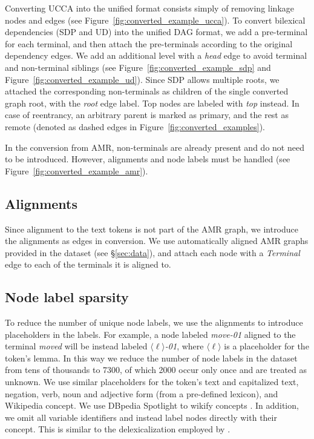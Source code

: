 \documentclass[11pt,a4paper]{article}
\begin{document}
Converting UCCA into the unified format consists simply of removing linkage nodes
and edges (see Figure~\ref{fig:converted_example_ucca}).
To convert bilexical dependencies (SDP and UD) into the unified DAG format,
we add a pre-terminal for each terminal,
and then attach the pre-terminals according to the original dependency edges.
We add an additional level with a \textit{head} edge to avoid terminal and non-terminal siblings
(see Figure~\ref{fig:converted_example_sdp} and Figure~\ref{fig:converted_example_ud}).
Since SDP allows multiple roots, we attached the corresponding non-terminals as children of
the single converted graph root, with the \textit{root} edge label.
Top nodes are labeled with \textit{top} instead.
In case of reentrancy, an arbitrary parent is marked as primary, and the rest as remote
(denoted as dashed edges in Figure~\ref{fig:converted_examples}).

In the conversion from AMR, non-terminals are already present and do not need to be introduced.
However, alignments and node labels must be handled
(see Figure~\ref{fig:converted_example_amr}).

\subsection{Alignments}
Since alignment to the text tokens is not part of the AMR graph,
we introduce the alignments as edges in conversion.
We use automatically aligned AMR graphs provided in the dataset (see \S\ref{sec:data}),
and attach each node with a \textit{Terminal} edge to each of the terminals it is aligned to.

\subsection{Node label sparsity}
To reduce the number of unique node labels, we use the alignments to introduce
placeholders in the labels.
For example, a node labeled \textit{move-01} aligned to the terminal \textit{moved} will
be instead labeled $\langle \ell \rangle$\textit{-01},
where $\langle \ell \rangle$ is a placeholder for the token's lemma.
In this way we reduce the number of node labels in the dataset from tens of thousands to 7300,
of which 2000 occur only once and are treated as unknown.
We use similar placeholders for the token's text and capitalized text,
negation, verb, noun and adjective form
(from a pre-defined lexicon), and Wikipedia concept.
We use DBpedia Spotlight to wikify concepts \cite{isem2013daiber}.
In addition, we omit all variable identifiers and instead label nodes directly with their concept.
This is similar to the delexicalization employed by \citet{buys2017oxford}.
\end{document}
